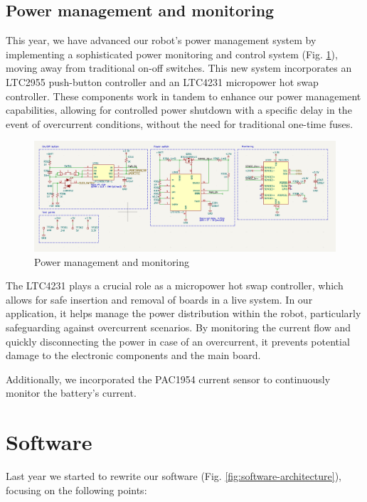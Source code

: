 \documentclass[runningheads]{llncs}
\begin{document}
\subsection{Power management and monitoring}

This year, we have advanced our robot's power management system by implementing a sophisticated power monitoring and control system (Fig. \ref{fig:PMU}), moving away from traditional on-off switches. This new system incorporates an LTC2955 push-button controller and an LTC4231 micropower hot swap controller. These components work in tandem to enhance our power management capabilities, allowing for controlled power shutdown with a specific delay in the event of overcurrent conditions, without the need for traditional one-time fuses.

\begin{figure}
    \centering
    \includegraphics[width=1\textwidth]{images/PMU.png}
    \caption{Power management and monitoring}
    \label{fig:PMU}
\end{figure}

The LTC4231 plays a crucial role as a micropower hot swap controller, which allows for safe insertion and removal of boards in a live system. In our application, it helps manage the power distribution within the robot, particularly safeguarding against overcurrent scenarios. By monitoring the current flow and quickly disconnecting the power in case of an overcurrent, it prevents potential damage to the electronic components and the main board.

Additionally, we incorporated the PAC1954 current sensor to continuously monitor the battery's current.

\section{Software}
Last year we started to rewrite our software (Fig. \ref{fig:software-architecture}), focusing on the following points:
\end{document}
